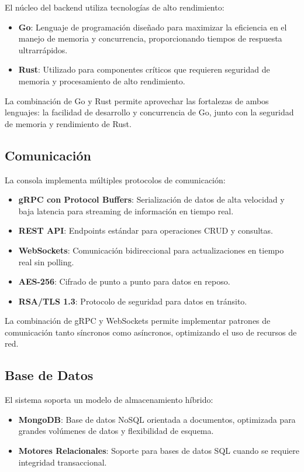 El núcleo del backend utiliza tecnologías de alto rendimiento:

\begin{itemize}
\item \textbf{Go}: Lenguaje de programación diseñado para maximizar la eficiencia en el manejo de memoria y concurrencia, proporcionando tiempos de respuesta ultrarrápidos.
\item \textbf{Rust}: Utilizado para componentes críticos que requieren seguridad de memoria y procesamiento de alto rendimiento.
\end{itemize}

La combinación de Go y Rust permite aprovechar las fortalezas de ambos lenguajes: la facilidad de desarrollo y concurrencia de Go, junto con la seguridad de memoria y rendimiento de Rust.

\subsection{Comunicación}

La consola implementa múltiples protocolos de comunicación:

\begin{itemize}
\item \textbf{gRPC con Protocol Buffers}: Serialización de datos de alta velocidad y baja latencia para streaming de información en tiempo real.
\item \textbf{REST API}: Endpoints estándar para operaciones CRUD y consultas.
\item \textbf{WebSockets}: Comunicación bidireccional para actualizaciones en tiempo real sin polling.
\item \textbf{AES-256}: Cifrado de punto a punto para datos en reposo.
\item \textbf{RSA/TLS 1.3}: Protocolo de seguridad para datos en tránsito.
\end{itemize}

La combinación de gRPC y WebSockets permite implementar patrones de comunicación tanto síncronos como asíncronos, optimizando el uso de recursos de red.

\subsection{Base de Datos}

El sistema soporta un modelo de almacenamiento híbrido:

\begin{itemize}
\item \textbf{MongoDB}: Base de datos NoSQL orientada a documentos, optimizada para grandes volúmenes de datos y flexibilidad de esquema.
\item \textbf{Motores Relacionales}: Soporte para bases de datos SQL cuando se requiere integridad transaccional.
\end{itemize}

